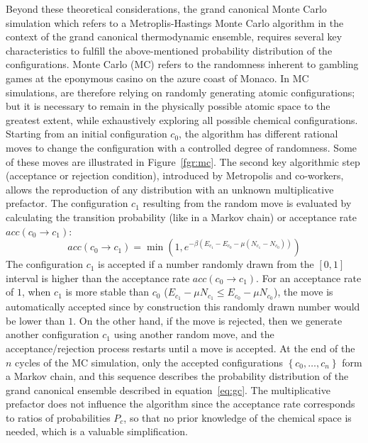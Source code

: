 \documentclass[main.tex]{subfiles}
\begin{document}
Beyond these theoretical considerations, the grand canonical Monte Carlo simulation which refers to a Metroplis-Hastings Monte Carlo algorithm in the context of the grand canonical thermodynamic ensemble, requires several key characteristics to fulfill the above-mentioned probability distribution of the configurations. Monte Carlo (MC) refers to the randomness inherent to gambling games at the eponymous casino on the azure coast of Monaco. In MC simulations, are therefore relying on randomly generating atomic configurations; but it is necessary to remain in the physically possible atomic space to the greatest extent, while exhaustively exploring all possible chemical configurations. 
Starting from an initial configuration $c_0$, the algorithm has different rational moves to change the configuration with a controlled degree of randomness. Some of these moves are illustrated in Figure~\ref{fgr:mc}. The second key algorithmic step (acceptance or rejection condition), introduced by Metropolis and co-workers, allows the reproduction of any distribution with an unknown multiplicative prefactor.\autocite{Metropolis1949} The configuration $c_1$ resulting from the random move is evaluated by calculating the transition probability (like in a Markov chain) or acceptance rate $acc(c_0 \rightarrow c_1)$: 
\begin{equation}
  acc(c_0 \rightarrow c_1) = \min\left(1, e^{-\beta\left(E_{c_1}-E_{c_0}-\mu \left(N_{c_1}-N_{c_0}\right)\right) }\right)
\end{equation}
The configuration $c_1$ is accepted if a number randomly drawn from the $[0,1]$ interval is higher than the acceptance rate $acc(c_0 \rightarrow c_1)$. For an acceptance rate of $1$, when $c_1$ is more stable than $c_0$ ($E_{c_1}-\mu N_{c_1}\leq E_{c_0}-\mu N_{c_0}$), the move is automatically accepted since by construction this randomly drawn number would be lower than $1$. On the other hand, if the move is rejected, then we generate another configuration $c_1$ using another random move, and the acceptance/rejection process restarts until a move is accepted. At the end of the $n$ cycles of the MC simulation, only the accepted configurations $\left\{c_0,\ldots,c_n\right\}$ form a Markov chain, and this sequence describes the probability distribution of the grand canonical ensemble described in equation~\ref{eq:gc}. The multiplicative prefactor does not influence the algorithm since the acceptance rate corresponds to ratios of probabilities $P_c$, so that no prior knowledge of the chemical space is needed, which is a valuable simplification.
\end{document}
